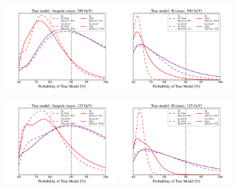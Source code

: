 \documentclass[11pt]{article}
\begin{document}
\begin{figure}
\centering
\includegraphics[width=0.45\textwidth]{plots/PDF_Single_500GeV_Anapole_50sims_Xe_vs_FGeXe_GF_TNT.pdf}
\includegraphics[width=0.45\textwidth]{plots/PDF_Single_500GeV_SI_Higgs_50sims_Xe_vs_FGeXe_GF_TNT.pdf}

\includegraphics[width=0.45\textwidth]{plots/PDF_Single_125GeV_Anapole_50sims_Xe_vs_FGeXe_GF_TNT.pdf}
\includegraphics[width=0.45\textwidth]{plots/PDF_Single_125GeV_SI_Higgs_50sims_Xe_vs_FGeXe_GF_TNT.pdf}


\end{figure}
\end{document}
